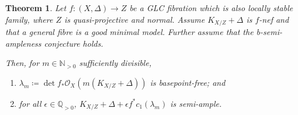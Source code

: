 \documentclass[12pt]{amsart}
\theoremstyle{plain}
\newtheorem{theorem}{Theorem}[section]
\theoremstyle{definition}
\def\det{\operatorname{det}}
\def\rar{\rightarrow}
\def\K#1.{K_{#1}}
\def \QP {\mathbb Q_{>0}}
\begin{document}
\begin{theorem}
\label{thm_locally_stable_semi-ample}
Let $f \colon (X,\Delta) \rar Z$ be a GLC fibration which is also locally stable family, where $Z$ is quasi-projective and normal.
Assume $\K X/Z. +\Delta$ is $f$-nef and 
that a general fibre is a good minimal model.
Further assume that the b-semi-ampleness conjecture holds.


Then, for $m \in \mathbb N_{>0}$ sufficiently divisible,
\begin{enumerate}
\item $\lambda_m \coloneqq \det f_* \mathcal{O}_X(m(\K X/Z. + \Delta))$ is basepoint-free; and

\item for all $\epsilon \in \QP$, $\K X/Z. + \Delta + \epsilon f^* c_1(\lambda_m)$ is semi-ample.
\end{enumerate}
\end{theorem}
\end{document}

